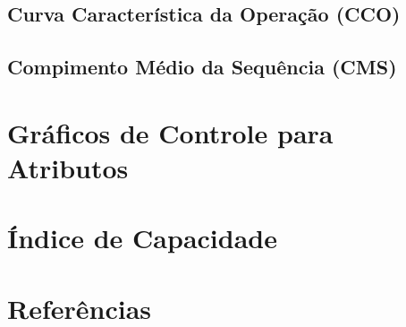 \documentclass[
  portuguese,
  11pt,
  a4paper,
  DIV=11,
  numbers=noendperiod]{scrreprt}
\begin{document}
\section{Curva Característica da Operação
(CCO)}\label{curva-caracteruxedstica-da-operauxe7uxe3o-cco}

\section{Compimento Médio da Sequência
(CMS)}\label{compimento-muxe9dio-da-sequuxeancia-cms}


\chapter{Gráficos de Controle para
Atributos}\label{gruxe1ficos-de-controle-para-atributos}


\chapter{Índice de Capacidade}\label{uxedndice-de-capacidade}


\chapter*{Referências}\label{referuxeancias}


\label{refs}
\end{document}
